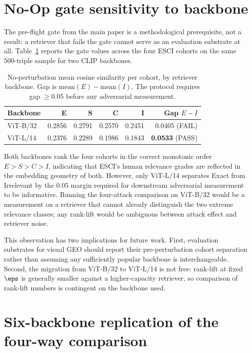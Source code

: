 \section{No-Op gate sensitivity to backbone}
\label{sm:noop}

The pre-flight gate from the main paper is a methodological prerequisite, not a result: a retriever that fails the gate cannot serve as an evaluation substrate at all. Table~\ref{sm:tab:noop} reports the gate values across the four ESCI cohorts on the same 500-triple sample for two CLIP backbones.

\begin{table}[t]
\centering
\caption{No-perturbation mean cosine similarity per cohort, by retriever backbone. Gap is $\mathrm{mean}(E) - \mathrm{mean}(I)$. The protocol requires gap $\geq 0.05$ before any adversarial measurement.}
\label{sm:tab:noop}
\small
\setlength{\tabcolsep}{3pt}
\begin{tabular}{lrrrrr}
\toprule
Backbone   & E      & S      & C      & I      & Gap $E{-}I$ \\
\midrule
ViT-B/32   & 0.2856 & 0.2791 & 0.2570 & 0.2451 & 0.0405 (FAIL) \\
ViT-L/14   & 0.2376 & 0.2289 & 0.1986 & 0.1843 & \textbf{0.0533} (PASS) \\
\bottomrule
\end{tabular}
\end{table}

Both backbones rank the four cohorts in the correct monotonic order $E > S > C > I$, indicating that ESCI's human relevance grades are reflected in the embedding geometry of both. However, only ViT-L/14 separates Exact from Irrelevant by the $0.05$ margin required for downstream adversarial measurement to be informative. Running the four-attack comparison on ViT-B/32 would be a measurement on a retriever that cannot already distinguish the two extreme relevance classes; any rank-lift would be ambiguous between attack effect and retriever noise.

This observation has two implications for future work. First, evaluation substrates for visual GEO should report their pre-perturbation cohort separation rather than assuming any sufficiently popular backbone is interchangeable. Second, the migration from ViT-B/32 to ViT-L/14 is not free: rank-lift at fixed $\eps$ is generally smaller against a higher-capacity retriever, so comparison of rank-lift numbers is contingent on the backbone used.

\section{Six-backbone replication of the four-way comparison}
\label{sm:cross-backbone}


